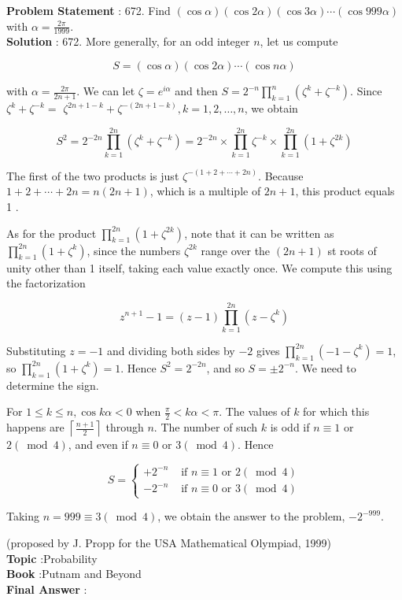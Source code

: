 \documentclass[10pt]{article}
\begin{document}
\textbf{Problem Statement} :
672. Find $(\cos \alpha)(\cos 2 \alpha)(\cos 3 \alpha) \cdots(\cos 999 \alpha)$ with $\alpha=\frac{2 \pi}{1999}$. 
\\
\textbf{Solution} :
672. More generally, for an odd integer $n$, let us compute

$$
S=(\cos \alpha)(\cos 2 \alpha) \cdots(\cos n \alpha)
$$

with $\alpha=\frac{2 \pi}{2 n+1}$. We can let $\zeta=e^{i \alpha}$ and then $S=2^{-n} \prod_{k=1}^{n}\left(\zeta^{k}+\zeta^{-k}\right)$. Since $\zeta^{k}+\zeta^{-k}=$ $\zeta^{2 n+1-k}+\zeta^{-(2 n+1-k)}, k=1,2, \ldots, n$, we obtain 

$$
S^{2}=2^{-2 n} \prod_{k=1}^{2 n}\left(\zeta^{k}+\zeta^{-k}\right)=2^{-2 n} \times \prod_{k=1}^{2 n} \zeta^{-k} \times \prod_{k=1}^{2 n}\left(1+\zeta^{2 k}\right)
$$

The first of the two products is just $\zeta^{-(1+2+\cdots+2 n)}$. Because $1+2+\cdots+2 n=n(2 n+1)$, which is a multiple of $2 n+1$, this product equals 1 .

As for the product $\prod_{k=1}^{2 n}\left(1+\zeta^{2 k}\right)$, note that it can be written as $\prod_{k=1}^{2 n}\left(1+\zeta^{k}\right)$, since the numbers $\zeta^{2 k}$ range over the $(2 n+1)$ st roots of unity other than 1 itself, taking each value exactly once. We compute this using the factorization

$$
z^{n+1}-1=(z-1) \prod_{k=1}^{2 n}\left(z-\zeta^{k}\right)
$$

Substituting $z=-1$ and dividing both sides by $-2$ gives $\prod_{k=1}^{2 n}\left(-1-\zeta^{k}\right)=1$, so $\prod_{k=1}^{2 n}\left(1+\zeta^{k}\right)=1$. Hence $S^{2}=2^{-2 n}$, and so $S=\pm 2^{-n}$. We need to determine the sign.

For $1 \leq k \leq n, \cos k \alpha<0$ when $\frac{\pi}{2}<k \alpha<\pi$. The values of $k$ for which this happens are $\left\lceil\frac{n+1}{2}\right\rceil$ through $n$. The number of such $k$ is odd if $n \equiv 1$ or $2(\bmod 4)$, and even if $n \equiv 0$ or $3(\bmod 4)$. Hence

$$
S= \begin{cases}+2^{-n} & \text { if } n \equiv 1 \text { or } 2(\bmod 4) \\ -2^{-n} & \text { if } n \equiv 0 \text { or } 3(\bmod 4)\end{cases}
$$

Taking $n=999 \equiv 3(\bmod 4)$, we obtain the answer to the problem, $-2^{-999}$.

(proposed by J. Propp for the USA Mathematical Olympiad, 1999)
\\
\textbf{Topic} :Probability\\
\textbf{Book} :Putnam and Beyond\\
\textbf{Final Answer} :\\
\end{document}
